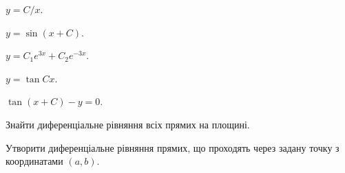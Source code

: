 \begin{problem}
	$y = C / x$.
\end{problem}

\begin{problem}
	$y = \sin (x + C)$.
\end{problem}

\begin{problem}
	$y = C_1 e^{3x} + C_2 e^{-3x}$.
\end{problem}

\begin{problem}
	$y = \tan C x$.
\end{problem}

\begin{problem}
	$\tan (x + C) - y = 0$.
\end{problem}

\begin{problem}
	Знайти диференціальне рівняння всіх прямих на площині.
\end{problem}

\begin{problem}
	Утворити диференціальне рівняння прямих, що проходять через задану точку з координатами $(a, b)$.
\end{problem}
